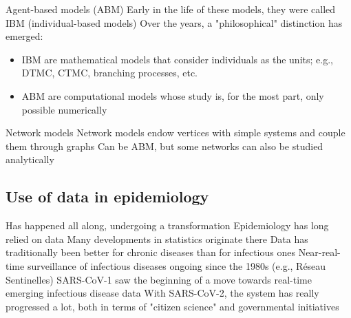 \documentclass[aspectratio=169]{beamer}\usepackage[]{graphicx}\usepackage[]{xcolor}
\begin{document}
\begin{frame}{Agent-based models (ABM)}
\bbullet Early in the life of these models, they were called IBM (individual-based models)
\vfill
\bbullet Over the years, a "philosophical" distinction has emerged:
\begin{itemize}
\item IBM are mathematical models that consider individuals as the units; e.g., DTMC, CTMC, branching processes, etc.
\item ABM are computational models whose study is, for the most part, only possible numerically 
\end{itemize}
\end{frame}

\begin{frame}{Network models}
\bbullet Network models endow vertices with simple systems and couple them through graphs
\vfill
\bbullet Can be ABM, but some networks can also be studied analytically

\end{frame}

\subsection{Use of data in epidemiology}

\begin{frame}{Has happened all along, undergoing a transformation}
\bbullet Epidemiology has long relied on data
\vfill
\bbullet Many developments in statistics originate there
\vfill
\bbullet Data has traditionally been better for chronic diseases than for infectious ones
\vfill
\bbullet Near-real-time surveillance of infectious diseases ongoing since the 1980s (e.g., Réseau Sentinelles)
\vfill
\bbullet SARS-CoV-1 saw the beginning of a move towards real-time emerging infectious disease data
\vfill
\bbullet With SARS-CoV-2, the system has really progressed a lot, both in terms of "citizen science" and governmental initiatives
\end{frame}
\end{document}
